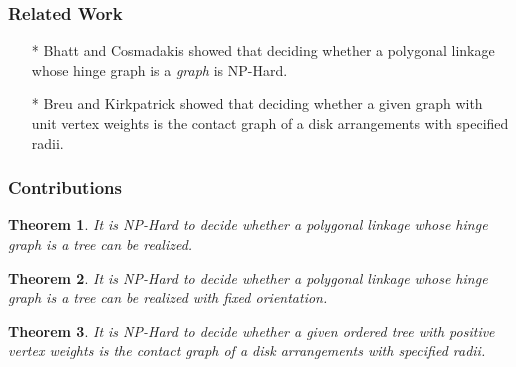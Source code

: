 \documentclass{beamer}
\newtheorem{thm}{Theorem}
\begin{document}
        


\begin{frame} \frametitle{Related Work}

\begin{itemize}
	\item[*] Bhatt and Cosmadakis showed that deciding whether a polygonal linkage whose hinge graph is a \textit{graph} is NP-Hard.
	\item[*] Breu and Kirkpatrick showed that deciding whether a given graph with unit vertex weights is the contact graph of a disk arrangements with specified radii.
\end{itemize}
        
\end{frame}

\begin{frame}\frametitle{Contributions}
     \begin{thm}
     It is NP-Hard to decide whether a polygonal linkage whose hinge graph is a \textit{tree} can be realized.
     \end{thm}
    \begin{thm} It is NP-Hard to decide whether a polygonal linkage whose hinge graph is a \textit{tree} can be realized with fixed orientation.
    \end{thm}
    \begin{thm} It is NP-Hard to decide whether a given ordered tree with positive vertex weights is the contact graph of a disk arrangements with specified radii.
    \end{thm}
\end{frame}
\end{document}
